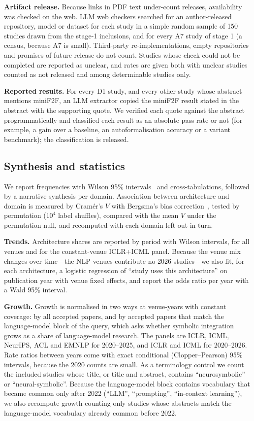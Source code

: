 \textbf{Artifact release.} Because links in PDF text under-count releases, availability was checked on the web. LLM web checkers searched for an author-released repository, model or dataset for each study in a simple random sample of 150 studies drawn from the stage-1 inclusions, and for every A7 study of stage 1 (a census, because A7 is small). Third-party re-implementations, empty repositories and promises of future release do not count. Studies whose check could not be completed are reported as unclear, and rates are given both with unclear studies counted as not released and among determinable studies only.

\textbf{Reported results.} For every D1 study, and every other study whose abstract mentions miniF2F, an LLM extractor copied the miniF2F result stated in the abstract with the supporting quote. We verified each quote against the abstract programmatically and classified each result as an absolute pass rate or not (for example, a gain over a baseline, an autoformalisation accuracy or a variant benchmark); the classification is released.

\subsection{Synthesis and statistics}
\label{sec:method-synthesis}
We report frequencies with Wilson 95\% intervals~\cite{wilson1927probable} and cross-tabulations, followed by a narrative synthesis per domain. Association between architecture and domain is measured by Cram\'er's $V$ with Bergsma's bias correction~\cite{bergsma2013bias}, tested by permutation ($10^4$ label shuffles), compared with the mean $V$ under the permutation null, and recomputed with each domain left out in turn.

\textbf{Trends.} Architecture shares are reported by period with Wilson intervals, for all venues and for the constant-venue ICLR+ICML panel. Because the venue mix changes over time---the NLP venues contribute no 2026 studies---we also fit, for each architecture, a logistic regression of ``study uses this architecture'' on publication year with venue fixed effects, and report the odds ratio per year with a Wald 95\% interval.

\textbf{Growth.} Growth is normalised in two ways at venue-years with constant coverage: by all accepted papers, and by accepted papers that match the language-model block of the query, which asks whether symbolic integration grows as a share of language-model research. The panels are ICLR, ICML, NeurIPS, ACL and EMNLP for 2020--2025, and ICLR and ICML for 2020--2026. Rate ratios between years come with exact conditional (Clopper--Pearson) 95\% intervals, because the 2020 counts are small. As a terminology control we count the included studies whose title, or title and abstract, contains ``neurosymbolic'' or ``neural-symbolic''. Because the language-model block contains vocabulary that became common only after 2022 (``LLM'', ``prompting'', ``in-context learning''), we also recompute growth counting only studies whose abstracts match the language-model vocabulary already common before 2022.

